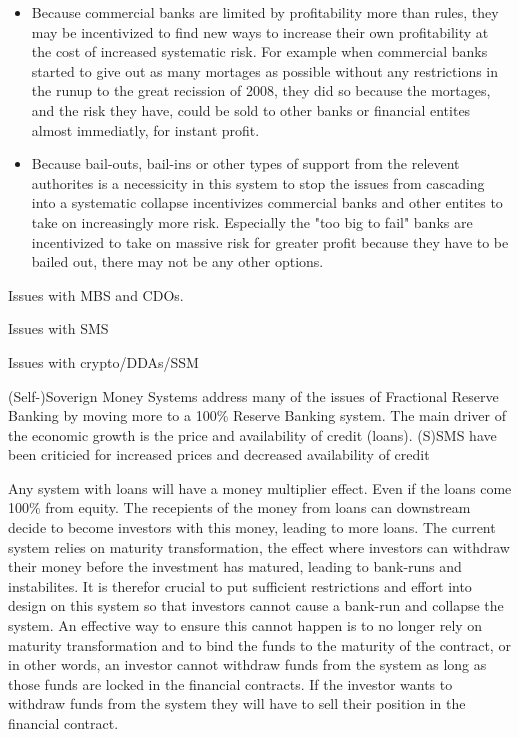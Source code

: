 \begin{itemize}
    \item Because commercial banks are limited by profitability more than rules, they may be incentivized to find new ways to increase their own profitability at the cost of increased systematic risk. For example when commercial banks started to give out as many mortages as possible without any restrictions in the runup to the great recission of 2008, they did so because the mortages, and the risk they have, could be sold to other banks or financial entites almost immediatly, for instant profit. 
    \item Because bail-outs, bail-ins or other types of support from the relevent authorites is a necessicity in this system to stop the issues from cascading into a systematic collapse incentivizes commercial banks and other entites to take on increasingly more risk. Especially the "too big to fail" banks are incentivized to take on massive risk for greater profit because they have to be bailed out, there may not be any other options. 
\end{itemize}

Issues with MBS and CDOs.

Issues with SMS

Issues with crypto/DDAs/SSM

(Self-)Soverign Money Systems address many of the issues of Fractional Reserve Banking by moving more to a 100\% Reserve Banking system. The main driver of the economic growth is the price and availability of credit (loans). (S)SMS have been criticied for increased prices and decreased availability of credit 

Any system with loans will have a money multiplier effect. Even if the loans come 100\% from equity. The recepients of the money from loans can downstream decide to become investors with this money, leading to more loans. The current system relies on maturity transformation, the effect where investors can withdraw their money before the investment has matured, leading to bank-runs and instabilites. It is therefor crucial to put sufficient restrictions and effort into design on this system so that investors cannot cause a bank-run and collapse the system. An effective way to ensure this cannot happen is to no longer rely on maturity transformation and to bind the funds to the maturity of the contract, or in other words, an investor cannot withdraw funds from the system as long as those funds are locked in the financial contracts. If the investor wants to withdraw funds from the system they will have to sell their position in the financial contract.

